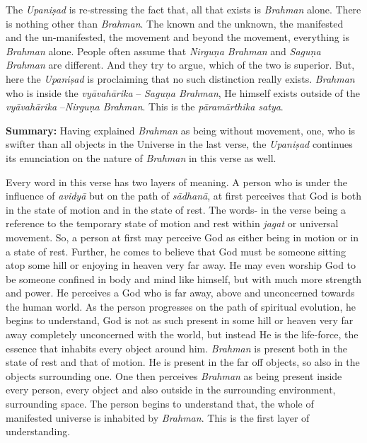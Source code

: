 The \emph{Upaniṣad} is re-stressing the fact that, all that exists is \emph{Brahman} alone. There is nothing other than \emph{Brahman}. The known and the unknown, the manifested and the un-manifested, the movement and beyond the movement, everything is \emph{Brahman} alone. People often assume that \emph{Nirguṇa Brahman} and \emph{Saguṇa Brahman} are different. And they try to argue, which of the two is superior. But, here the \emph{Upaniṣad} is proclaiming that no such distinction really exists. \emph{Brahman} who is inside the \emph{vyāvahārika} -- \emph{Saguṇa Brahman}, He himself exists outside of the \emph{vyāvahārika} --\emph{Nirguṇa Brahman}. This is the \emph{pāramārthika satya}.

\textbf{Summary:} Having explained \emph{Brahman} as being without movement, one, who is swifter than all objects in the Universe in the last verse, the \emph{Upaniṣad} continues its enunciation on the nature of \emph{Brahman} in this verse as well.

Every word in this verse has two layers of meaning. A person who is under the influence of \emph{avidyā} but on the path of \emph{sādhanā}, at first perceives that God is both in the state of motion and in the state of rest. The words-  in the verse being a reference to the temporary state of motion and rest within \emph{jagat} or universal movement. So, a person at first may perceive God as either being in motion or in a state of rest. Further, he comes to believe that God must be someone sitting atop some hill or enjoying in heaven very far away. He may even worship God to be someone confined in body and mind like himself, but with much more strength and power. He perceives a God who is far away, above and unconcerned towards the human world. As the person progresses on the path of spiritual evolution, he begins to understand, God is not as such present in some hill or heaven very far away completely unconcerned with the world, but instead He is the life-force, the essence that inhabits every object around him. \emph{Brahman} is present both in the state of rest and that of motion. He is present in the far off objects, so also in the objects surrounding one. One then perceives \emph{Brahman} as being present inside every person, every object and also outside in the surrounding environment, surrounding space. The person begins to understand that, the whole of manifested universe is inhabited by \emph{Brahman}. This is the first layer of understanding.

